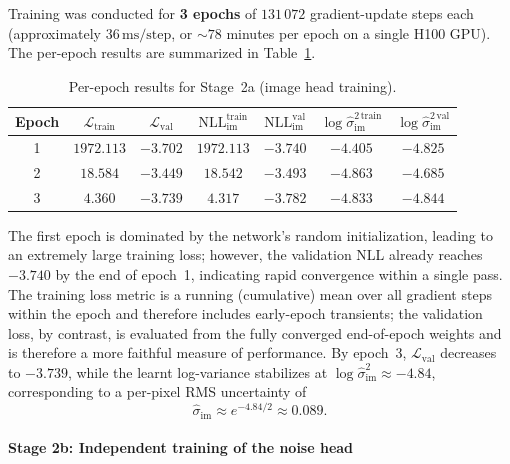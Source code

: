 \documentclass{aa}
\begin{document}
Training was conducted for \textbf{3 epochs} of $131\,072$ gradient-update steps each (approximately $36\,\mathrm{ms/step}$, or $\sim 78$ minutes per epoch on a single H100 GPU). The per-epoch results are summarized in Table~\ref{tab:step2a}.

\begin{table}[h]
\centering
\begin{tabular}{|c|c|c|c|c|c|c|}
\hline
\textbf{Epoch} & $\mathcal{L}_\mathrm{train}$ & $\mathcal{L}_\mathrm{val}$ & $\mathrm{NLL}_\mathrm{im}^\mathrm{train}$ & $\mathrm{NLL}_\mathrm{im}^\mathrm{val}$ & $\log\hat{\sigma}^{2\,\mathrm{train}}_\mathrm{im}$ & $\log\hat{\sigma}^{2\,\mathrm{val}}_\mathrm{im}$ \\
\hline
1 & $1972.113$ & $-3.702$ & $1972.113$ & $-3.740$ & $-4.405$ & $-4.825$ \\
2 & $18.584$ & $-3.449$ & $18.542$ & $-3.493$ & $-4.863$ & $-4.685$ \\
3 & $\mathbf{4.360}$ & $\mathbf{-3.739}$ & $4.317$ & $-3.782$ & $-4.833$ & $-4.844$ \\
\hline
\end{tabular}
\caption{Per-epoch results for Stage~2a (image head training).}
\label{tab:step2a}
\end{table}

The first epoch is dominated by the network's random initialization, leading to an extremely large training loss; however, the validation NLL already reaches $-3.740$ by the end of epoch~1, indicating rapid convergence within a single pass. The training loss metric is a running (cumulative) mean over all gradient steps within the epoch and therefore includes early-epoch transients; the validation loss, by contrast, is evaluated from the fully converged end-of-epoch weights and is therefore a more faithful measure of performance. By epoch~3, $\mathcal{L}_\mathrm{val}$ decreases to $-3.739$, while the learnt log-variance stabilizes at $\log\hat{\sigma}^2_\mathrm{im} \approx -4.84$, corresponding to a per-pixel RMS uncertainty of
\begin{equation}
\hat{\sigma}_\mathrm{im} \approx e^{-4.84/2} \approx 0.089.
\end{equation}

\paragraph{Stage 2b: Independent training of the noise head}
\end{document}
